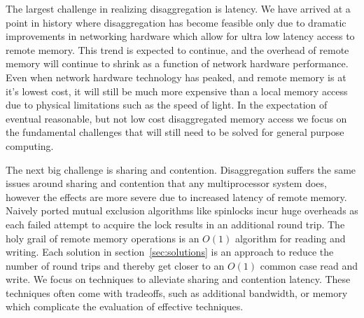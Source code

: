 The largest challenge in realizing disaggregation is latency. We have arrived at
a point in history where disaggregation has become feasible only due to dramatic
improvements in networking hardware which allow for ultra low latency access to
remote memory. This trend is expected to continue, and the overhead of remote
memory will continue to shrink as a function of network hardware performance.
Even when network hardware technology has peaked, and remote memory is at
it's lowest cost, it will still be much more expensive than a local memory
access due to physical limitations such as the speed of light. In the
expectation of eventual reasonable, but not low cost disaggregated memory access
we focus on the fundamental challenges that will still need to be solved for
general purpose computing. 

The next big challenge is sharing and contention. Disaggregation suffers the
same issues around sharing and contention that any multiprocessor system does,
however the effects are more severe due to increased latency of remote memory.
Naively ported mutual exclusion algorithms like spinlocks incur huge overheads
as each failed attempt to acquire the lock results in an additional round trip.
The holy grail of remote memory operations is an $O(1)$ algorithm for reading
and writing. Each solution in section~\ref{sec:solutions} is an approach to
reduce the number of round trips and thereby get closer to an $O(1)$ common case
read and write.  We focus on techniques to alleviate sharing and contention
latency. These techniques often come with tradeoffs, such as additional
bandwidth, or memory which complicate the evaluation of effective techniques.

